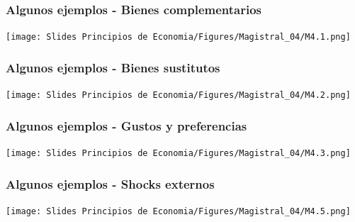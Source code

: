 \documentclass{beamer}
\begin{document}

\begin{frame}
\frametitle{Algunos ejemplos - Bienes complementarios}
    \begin{center}
    \texttt{[image: Slides Principios de Economia/Figures/Magistral\_04/M4.1.png]}
    \end{center}
\end{frame}

\begin{frame}
\frametitle{Algunos ejemplos - Bienes sustitutos}
    \begin{center}
    \texttt{[image: Slides Principios de Economia/Figures/Magistral\_04/M4.2.png]}
    \end{center}
\end{frame}

\begin{frame}
\frametitle{Algunos ejemplos - Gustos y preferencias}
    \begin{center}
    \texttt{[image: Slides Principios de Economia/Figures/Magistral\_04/M4.3.png]}
    \end{center}
\end{frame}

\begin{frame}
\frametitle{Algunos ejemplos - Shocks externos}
    \begin{center}
    \texttt{[image: Slides Principios de Economia/Figures/Magistral\_04/M4.5.png]}
    \end{center}
\end{frame}
\end{document}
